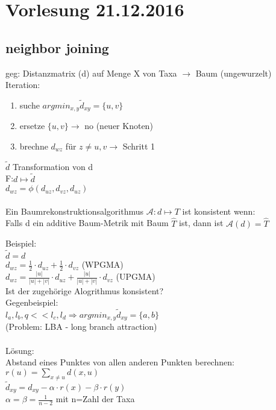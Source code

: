 \section{Vorlesung 21.12.2016}
\subsection{neighbor joining}
geg: Distanzmatrix (d) auf Menge X von Taxa $\rightarrow$ Baum (ungewurzelt)\\
Iteration:
\begin{enumerate}
	\item suche $argmin_{x,y} \tilde d_{xy}=\{u,v\}$
	\item ersetze $\{u,v\} \rightarrow$ no (neuer Knoten)
	\item brechne $d_{wz}$ für $z \neq u,v \rightarrow$ Schritt 1
\end{enumerate}
$\tilde d$ Transformation von d\\
F:$d \mapsto \tilde d$\\
$d_{wz}=\phi(d_{uz}, d_{vz}, d_{uz})$
\\\\
Ein Baumrekonstruktionsalgorithmus $\mathcal{A}:d \mapsto T$ ist konsistent wenn:\\
Falls d ein additive Baum-Metrik mit Baum $\hat T$ ist, dann ist $\mathcal{A}(d)=\hat T$

Beispiel:\\
$\tilde d = d$\\
$d_{wz}=\frac{1}{2} \cdot d_{uz} + \frac{1}{2} \cdot d_{vz}$ (WPGMA)\\
$d_{wz}=\frac{|u|}{|u| + |v|} \cdot d_{uz} + \frac{|u|}{|u| + |v|} \cdot d_{vz}$ (UPGMA)\\
Ist der zugehörige Alogrithmus konsistent?\\
Gegenbeispiel:\\
$l_a,l_b,q << l_c,l_d \Rightarrow argmin_{x,y} \tilde d_{xy}=\{a,b\}$\\
(Problem: LBA - long branch attraction)\\\\
Lösung:\\
Abstand eines Punktes von allen anderen Punkten berechnen:$r(u)=\displaystyle \sum_{x \neq u}d(x,u)$\\
$\tilde d_{xy}=d_{xy}-\alpha \cdot r(x) - \beta \cdot r(y)$\\
$\alpha = \beta = \frac{1}{n-2}$ mit n=Zahl der Taxa\\

